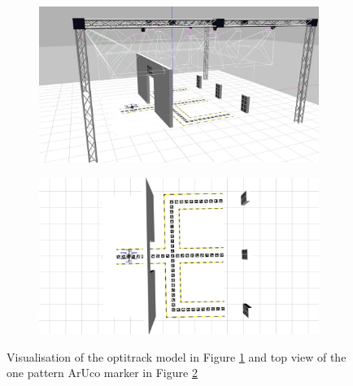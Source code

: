 \documentclass[../Head/report.tex]{subfiles}
\begin{document}
\begin{figure}[H]
    \centering
    \begin{subfigure}[t]{.48\textwidth}
        \centering
        \includegraphics[width=\textwidth]{../Figures/gazebo_one_pattern_view.jpg}
        \caption{}
        \label{fig:optitrack_one_pattern_aruco}
    \end{subfigure}
    \hfill
    \begin{subfigure}[t]{.48\textwidth}
        \centering
        \includegraphics[width=\textwidth]{../Figures/gazebo_one_pattern.jpg}
        \caption{}
        \label{fig:one_pattern_aruco}
    \end{subfigure}
    \caption{Visualisation of the optitrack model in Figure \ref{fig:optitrack_one_pattern_aruco} and top view of the one pattern ArUco marker in Figure \ref{fig:one_pattern_aruco}}
    \label{fig:one_pattern_aruco_fig}
\end{figure}
\end{document}
